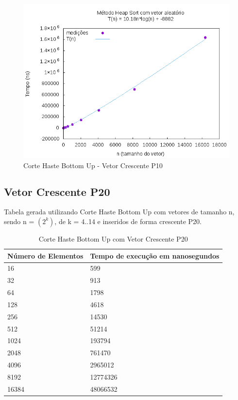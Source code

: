 \documentclass[12pt,a4paper,twoside]{report}
\begin{document}
\begin{figure}[H]
    \centering
    \includegraphics[width=0.7\linewidth]{graficos/HeapSort/vIntAleatorio/vIntAleatorio.png}
  \caption{Corte Haste Bottom Up - Vetor Crescente P10}
\end{figure}


\subsection{Vetor Crescente P20}
Tabela gerada utilizando Corte Haste Bottom Up com vetores de tamanho n, sendo n = $(2^k)$, de k = 4..14 e inseridos de forma crescente P20.
\begin{table}[H]
\centering
\caption{Corte Haste Bottom Up com Vetor Crescente P20}
\label{my-label}
\begin{tabular}{|l|l|}
\hline
\multicolumn{1}{|c|}{\textbf{Número de Elementos}} & \multicolumn{1}{c|}{\textbf{Tempo de execução em nanosegundos}} \\ \hline
16 & 599 \\ \hline
32 & 913 \\ \hline
64 & 1798 \\ \hline
128 & 4618 \\ \hline
256 & 14530 \\ \hline
512 & 51214 \\ \hline
1024 & 193794 \\ \hline
2048 & 761470 \\ \hline
4096 & 2965012 \\ \hline
8192 & 12774326 \\ \hline
16384 & 48066532 \\ \hline
\end{tabular}
\end{table}
\end{document}

